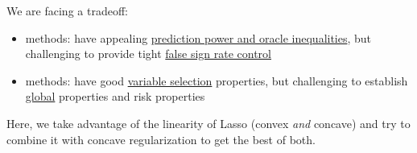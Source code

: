 \documentclass[twoside]{article}
\begin{document}

We are facing a tradeoff:
\begin{itemize}
    \item {} methods: have appealing \underline{prediction power and oracle inequalities}, but challenging to provide tight \underline{false sign rate control}
    \item {} methods: have good \underline{variable selection} properties, but challenging to establish \underline{global} properties and risk properties
\end{itemize}

Here, we take advantage of the linearity of Lasso (convex \textit{and} concave) and try to combine it with concave regularization to get the best of both.
\end{document}
